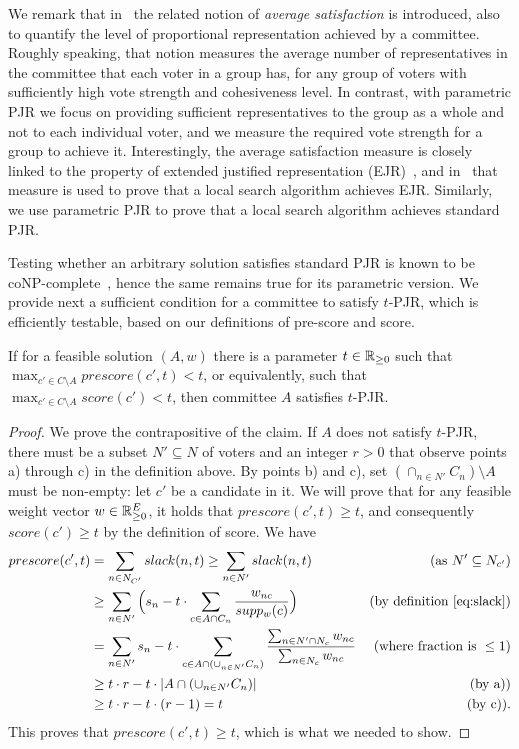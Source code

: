 We remark that in~\cite{sanchez2017proportional} the related notion of \emph{average satisfaction} is introduced, also to quantify the level of proportional representation achieved by a committee. Roughly speaking, that notion measures the average number of representatives in the committee that each voter in a group has, for any group of voters with sufficiently high vote strength and cohesiveness level. 
In contrast, with parametric PJR we focus on providing sufficient representatives to the group as a whole and not to each individual voter, and we measure the required vote strength for a group to achieve it.
Interestingly, the average satisfaction measure is closely linked to the property of extended justified representation (EJR)~\cite{aziz2017justified}, and in~\cite{aziz2018complexity} that measure is used to prove that a local search algorithm achieves EJR. 
Similarly, we use parametric PJR to prove that a local search algorithm achieves standard PJR.

Testing whether an arbitrary solution satisfies standard PJR is known to be coNP-complete~\cite{aziz2018complexity}, hence the same remains true for its parametric version.
We provide next a sufficient condition for a committee to satisfy $t$-PJR, which is efficiently testable, based on our definitions of pre-score and score.  

\begin{lemma} \label{lem:locality}
If for a feasible solution $(A,w)$ there is a parameter $t\in\mathbb{R}_{\geq 0}$ such that $\max_{c'\in C\setminus A} prescore(c',t)<t$, or equivalently, such that $\max_{c'\in C\setminus A} score(c') <t$, then committee $A$ satisfies $t$-PJR. 
\end{lemma}

\begin{proof} 
We prove the contrapositive of the claim. If $A$ does not satisfy $t$-PJR, there must be a subset $N'\subseteq N$ of voters and an integer $r>0$ that observe points a) through c) in the definition above. By points b) and c), set $(\cap_{n\in N'} C_n)\setminus A$ must be non-empty: let $c'$ be a candidate in it. 
We will prove that for any feasible weight vector $w\in \mathbb{R}_{\geq 0}^E$, it holds that $prescore(c',t)\geq t$, and consequently $score(c')\geq t$ by the definition of score. We have
%
\begin{align*} 
prescore(c',t) &= \sum_{n\in N_{C'}}  slack(n,t) \geq \sum_{n\in N'} slack(n,t) & (\text{as } N'\subseteq N_{c'}) \\
&\geq \sum_{n\in N'} \Big(s_n - t\cdot \sum_{c\in A\cap C_n} \frac{w_{nc}}{supp_w(c)}\Big)  
& (\text{by definition \ref{eq:slack}})\\
&= \sum_{n\in N'} s_n - t \cdot \sum_{c\in A\cap (\cup_{n\in N'} C_n)} 
\frac{\sum_{n\in N'\cap N_c} w_{nc}}{\sum_{n\in N_c} w_{nc}} 
& (\text{where fraction is } \leq 1)\\ 
& \geq t\cdot r - t\cdot |A\cap (\cup_{n\in N'} C_n)| & (\text{by a)})\\
& \geq t\cdot r - t\cdot (r-1) = t & (\text{by c)}). 
\end{align*}
%
This proves that $prescore(c',t) \geq t$, which is what we needed to show.
\end{proof}

